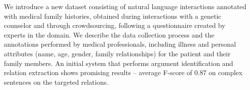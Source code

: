 We introduce a new dataset consisting of natural language interactions annotated with medical family histories, obtained during interactions with a genetic counselor and through crowdsourcing, following a questionnaire created by experts in the domain. We describe the data collection process and the annotations performed  by medical professionals, including illness and personal attributes (name, age, gender, family relationships) for the patient and their family members. An initial system that performs argument identification and relation extraction shows promising results -- average F-score of 0.87 on complex sentences on the targeted relations.